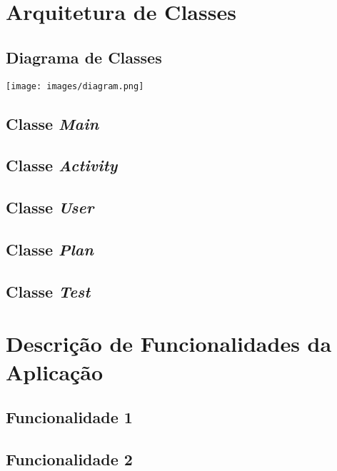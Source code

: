 \documentclass[a4paper,12pt]{scrreprt}
\begin{document}

\chapter{Arquitetura de Classes}
    \section{Diagrama de Classes}
        \begin{center}
            \texttt{[image: images/diagram.png]}
        \end{center}
    \section{Classe \textit{Main}}
    \section{Classe \textit{Activity}}
    \section{Classe \textit{User}}
    \section{Classe \textit{Plan}}
    \section{Classe \textit{Test}}



\chapter{Descrição de Funcionalidades da Aplicação}
    \section{Funcionalidade 1}
    \section{Funcionalidade 2}
\end{document}
